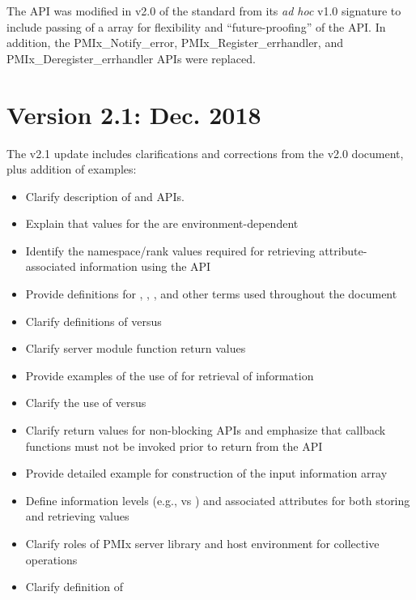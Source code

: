 The  \ac{API} was modified in v2.0 of the standard from its \textit{ad hoc} v1.0 signature to include passing of a  array for flexibility and ``future-proofing'' of the \ac{API}.
In addition, the PMIx_Notify_error, PMIx_Register_errhandler, and PMIx_Deregister_errhandler \acp{API} were replaced.

\section{Version 2.1: Dec. 2018}

The v2.1 update includes clarifications and corrections from the v2.0 document, plus addition of examples:

\begin{itemize}
    \item Clarify description of  and  \acp{API}.
    \item Explain that values for the  are environment-dependent
    \item Identify the namespace/rank values required for retrieving attribute-associated information using the  \ac{API}
    \item Provide definitions for , , , and other terms used throughout the document
    \item Clarify definitions of  versus 
    \item Clarify server module function return values
    \item Provide examples of the use of  for retrieval of information
    \item Clarify the use of  versus 
    \item Clarify return values for non-blocking \acp{API} and emphasize that callback functions must not be invoked prior to return from the \ac{API}
    \item Provide detailed example for construction of the  input information array
    \item Define information levels (e.g.,  vs ) and associated attributes for both storing and retrieving values
    \item Clarify roles of \ac{PMIx} server library and host environment for collective operations
    \item Clarify definition of 
\end{itemize}

